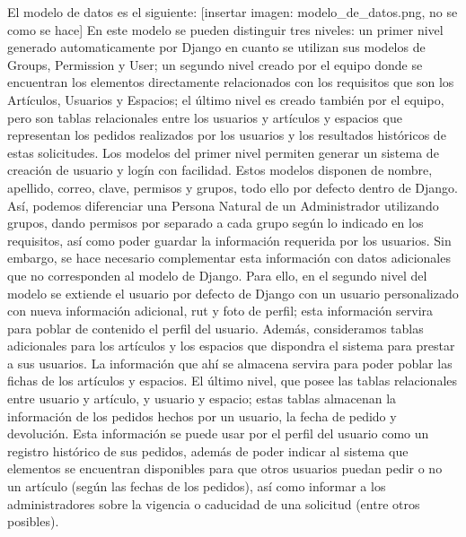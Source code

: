 El modelo de datos es el siguiente:
[insertar imagen: modelo_de_datos.png, no se como se hace]
En este modelo se pueden distinguir tres niveles: un primer nivel generado automaticamente por Django en cuanto se utilizan sus modelos de Groups, Permission y User; un segundo nivel creado por el equipo donde se encuentran los elementos directamente relacionados con los requisitos que son los Artículos, Usuarios y Espacios; el último nivel es creado también por el equipo, pero son tablas relacionales entre los usuarios y artículos y espacios que representan los pedidos realizados por los usuarios y los resultados históricos de estas solicitudes.
Los modelos del primer nivel permiten generar un sistema de creación de usuario y logín con facilidad. Estos modelos disponen de nombre, apellido, correo, clave, permisos y grupos, todo ello por defecto dentro de Django. Así, podemos diferenciar una Persona Natural de un Administrador utilizando grupos, dando permisos por separado a cada grupo según lo indicado en los requisitos, así como poder guardar la información requerida por los usuarios.
Sin embargo, se hace necesario complementar esta información con datos adicionales que no corresponden al modelo de Django. Para ello, en el segundo nivel del modelo se extiende el usuario por defecto de Django con un usuario personalizado con nueva información adicional, rut y foto de perfil; esta información servira para poblar de contenido el perfil del usuario. Además, consideramos tablas adicionales para los artículos y los espacios que dispondra el sistema para prestar a sus usuarios. La información que ahí se almacena servira para poder poblar las fichas de los artículos y espacios.
El último nivel, que posee las tablas relacionales entre usuario y artículo, y usuario y espacio; estas tablas almacenan la información de los pedidos hechos por un usuario, la fecha de pedido y devolución. Esta información se puede usar por el perfil del usuario como un registro histórico de sus pedidos, además de poder indicar al sistema que elementos se encuentran disponibles para que otros usuarios puedan pedir o no un artículo (según las fechas de los pedidos), así como informar a los administradores sobre la vigencia o caducidad de una solicitud (entre otros posibles). 